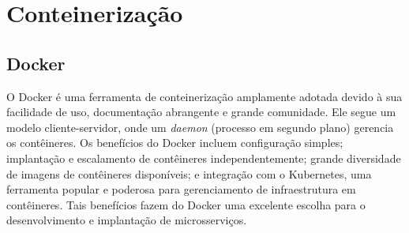 



\section{Conteinerização}

\subsection*{Docker}
O Docker é uma ferramenta de conteinerização amplamente adotada devido à sua facilidade de uso, documentação abrangente e grande comunidade. Ele segue um modelo cliente-servidor, onde um \emph{daemon} (processo em segundo plano) gerencia os contêineres. Os benefícios do Docker incluem configuração simples; implantação e escalamento de contêineres independentemente; grande diversidade de imagens de contêineres disponíveis; e integração com o Kubernetes, uma ferramenta popular e poderosa para gerenciamento de infraestrutura em contêineres. Tais benefícios fazem do Docker uma excelente escolha para o desenvolvimento e implantação de microsserviços. 



